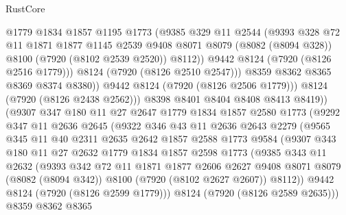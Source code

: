 \begin{lexlean}{RustCore}
\begin{coremodule}
                    @1779
                    @1834
                    @1857
                    @1195
                    @1773
                    (@9385
                      @329
                      @11
                      @2544
                      (@9393
                        @328
                        @72
                        @11
                        @1871
                        @1877
                        @1145
                        @2539
                        @9408
                        @8071
                        @8079
                        (@8082 (@8094 @328))
                        @8100
                        (@7920 (@8102 @2539 @2520))
                        @8112))
                    @9442
                    @8124
                    (@7920 (@8126 @2516 @1779)))
                  @8124
                  (@7920 (@8126 @2510 @2547)))
                @8359
                @8362
                @8365
                @8369
                @8374
                @8380))
            @9442
            @8124
            (@7920 (@8126 @2506 @1779)))
          @8124
          (@7920 (@8126 @2438 @2562)))
        @8398
        @8401
        @8404
        @8408
        @8413
        @8419))
    (@9307
      @347
      @180
      @11
      @27
      @2647
      @1779
      @1834
      @1857
      @2580
      @1773
      (@9292
        @347
        @11
        @2636
        @2645
        (@9322
          @346
          @43
          @11
          @2636
          @2643
          @2279
          (@9565
            @345
            @11
            @40
            @2311
            @2635
            @2642
            @1857
            @2588
            @1773
            @9584
            (@9307
              @343
              @180
              @11
              @27
              @2632
              @1779
              @1834
              @1857
              @2598
              @1773
              (@9385
                @343
                @11
                @2632
                (@9393
                  @342
                  @72
                  @11
                  @1871
                  @1877
                  @2606
                  @2627
                  @9408
                  @8071
                  @8079
                  (@8082 (@8094 @342))
                  @8100
                  (@7920 (@8102 @2627 @2607))
                  @8112))
              @9442
              @8124
              (@7920 (@8126 @2599 @1779)))
            @8124
            (@7920 (@8126 @2589 @2635)))
          @8359
          @8362
          @8365

\end{coremodule}
\end{lexlean}
